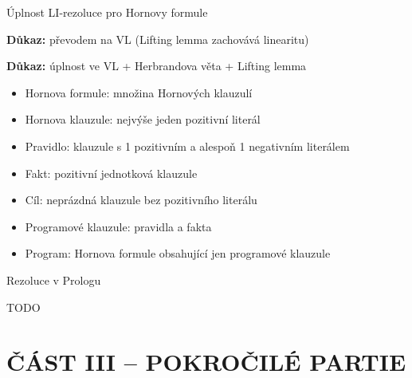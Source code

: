 \documentclass{beamer}
\begin{document}
\begin{frame}{Úplnost LI-rezoluce pro Hornovy formule}

    \medskip


    \textbf{Důkaz:} převodem na VL (Lifting lemma zachovává linearitu) \hfill\qedsymbol

    \bigskip

        
    \textbf{Důkaz:} úplnost ve VL + Herbrandova věta + Lifting lemma\hfill\qedsymbol

    \smallskip
    
    \begin{itemize}\small
        \item \alert{Hornova formule:} množina Hornových klauzulí
        \item \alert{Hornova klauzule:} nejvýše jeden pozitivní literál   
        \item \alert{Pravidlo:} klauzule s 1 pozitivním a alespoň 1 negativním literálem  
         
        \item \alert{Fakt:} pozitivní jednotková klauzule    
        \item \alert{Cíl:} neprázdná klauzule bez pozitivního literálu 
        \item \alert{Programové klauzule:} pravidla a fakta  
        \item \alert{Program}: Hornova formule obsahující jen programové klauzule
    \end{itemize}

\end{frame}


\begin{frame}{Rezoluce v Prologu}

    \begin{center}
        TODO
    \end{center}
    
\end{frame}


\section{ČÁST III -- POKROČILÉ PARTIE}
\end{document}

